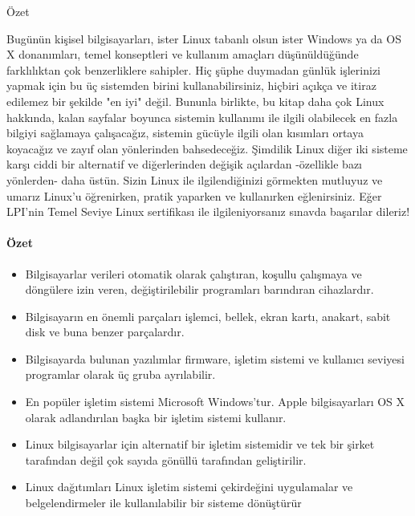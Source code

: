 \begin{section}{Özet}

Bugünün kişisel bilgisayarları, ister Linux tabanlı olsun ister Windows ya da OS X donanımları, temel konseptleri ve kullanım amaçları düşünüldüğünde farklılıktan çok benzerliklere sahipler. Hiç şüphe duymadan günlük işlerinizi yapmak için bu üç sistemden birini kullanabilirsiniz, hiçbiri açıkça ve itiraz edilemez bir şekilde "en iyi" değil. Bununla birlikte, bu kitap daha çok Linux hakkında, kalan sayfalar boyunca sistemin kullanımı ile ilgili olabilecek en fazla bilgiyi sağlamaya çalışacağız, sistemin gücüyle ilgili olan kısımları ortaya koyacağız ve zayıf olan yönlerinden bahsedeceğiz. Şimdilik Linux diğer iki sisteme karşı ciddi bir alternatif ve diğerlerinden değişik açılardan -özellikle bazı yönlerden- daha üstün. Sizin Linux ile ilgilendiğinizi görmekten mutluyuz ve umarız Linux'u öğrenirken, pratik yaparken ve kullanırken eğlenirsiniz. Eğer LPI'nin Temel Seviye Linux sertifikası ile ilgileniyorsanız sınavda başarılar dileriz!
\paragraph{Özet}{
\begin{itemize}
\item Bilgisayarlar verileri otomatik olarak çalıştıran, koşullu çalışmaya ve döngülere izin veren, değiştirilebilir programları barındıran cihazlardır.
\item Bilgisayarın en önemli parçaları işlemci, bellek, ekran kartı, anakart, sabit disk ve buna benzer parçalardır. 
\item Bilgisayarda bulunan yazılımlar firmware, işletim sistemi ve kullanıcı seviyesi programlar olarak üç gruba ayrılabilir. 
\item En popüler işletim sistemi Microsoft Windows'tur. Apple bilgisayarları OS X olarak adlandırılan başka bir işletim sistemi kullanır.
\item Linux bilgisayarlar için alternatif bir işletim sistemidir ve tek bir şirket tarafından değil çok sayıda gönüllü tarafından geliştirilir. 
\item Linux dağıtımları Linux işletim sistemi çekirdeğini uygulamalar ve belgelendirmeler ile kullanılabilir bir sisteme dönüştürür
\end{itemize}}
\end{section}


